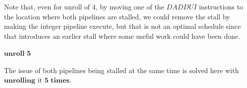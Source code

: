 \documentclass{tufte-handout}
\begin{document}
		Note that, even for unroll of 4, by moving one of the $DADDUI$ instructions to the location where both pipelines are stalled, we could remove the stall by making the integer pipeline execute, but that is not an optimal schedule since that introduces an earlier stall where some useful work could have been done.

	\paragraph{$\textbf{unroll 5}$}
	The issue of both pipelines being stalled at the same time is solved here with $\textbf{unrolling}$ it $\textbf{5 times}$.
\end{document}
